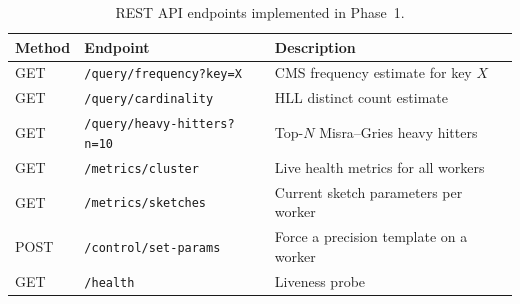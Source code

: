 \begin{table}[htbp]
\centering
\begin{tabular}{l l l}
\toprule
\textbf{Method} & \textbf{Endpoint} & \textbf{Description} \\
\midrule
GET  & \texttt{/query/frequency?key=X}   & CMS frequency estimate for key $X$ \\
GET  & \texttt{/query/cardinality}        & HLL distinct count estimate \\
GET  & \texttt{/query/heavy-hitters?n=10} & Top-$N$ Misra--Gries heavy hitters \\
GET  & \texttt{/metrics/cluster}          & Live health metrics for all workers \\
GET  & \texttt{/metrics/sketches}         & Current sketch parameters per worker \\
POST & \texttt{/control/set-params}       & Force a precision template on a worker \\
GET  & \texttt{/health}                   & Liveness probe \\
\bottomrule
\end{tabular}
\caption{REST API endpoints implemented in Phase~1.}
\label{tab:api_endpoints}
\end{table}
